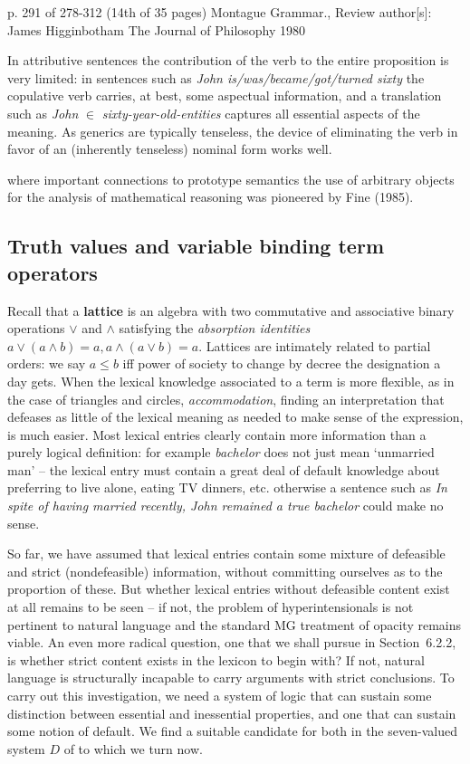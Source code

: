 p. 291 of 278-312 (14th of 35 pages) Montague Grammar., Review author[s]:
James Higginbotham The Journal of Philosophy 1980 

In attributive sentences the contribution of the verb to the entire
proposition is very limited: in sentences such as {\it John
is/was/became/got/turned sixty} the copulative verb carries, at best, some
aspectual information, and a translation such as {\it John} $\in$ {\it
sixty-year-old-entities} captures all essential aspects of the meaning.  As
generics are typically tenseless, the device of eliminating the verb in favor
of an (inherently tenseless) nominal form works well. 

where important connections to prototype semantics the use of arbitrary
objects for the analysis of mathematical reasoning was pioneered by Fine
(1985).


\subsection{Truth values and variable binding term operators}

Recall that a {\bf lattice}  is an algebra with two commutative
and associative binary operations $\vee$ and $\wedge$ satisfying the {\it  
  absorption identities} $a \vee (a \wedge b) = a, a \wedge (a \vee b) =
a$. Lattices are intimately related to partial orders: we say $a \leq b $ iff 
power of society to change by decree the designation a day gets. When the  
lexical knowledge associated to a term is more flexible, as in the case of 
triangles and circles, {\it accommodation}, finding an interpretation that
defeases as little of the lexical meaning as needed to make sense of the
expression, is much easier.  Most lexical entries clearly
contain more information than a purely logical definition: for example {\it  
bachelor} does not just mean `unmarried man' -- the lexical entry must
contain a great deal of default knowledge about preferring to live alone,
eating TV dinners, etc. otherwise a sentence such as {\it In spite of having
married recently, John remained a true bachelor} could make no sense.

So far, we have assumed that lexical entries contain some mixture of
defeasible and strict (nondefeasible) information, without committing
ourselves as to the proportion of these. But whether lexical entries without
defeasible content exist at all remains to be seen -- if not, the problem of
hyperintensionals is not pertinent to natural language and the standard MG
treatment of opacity remains viable. An even more radical question, one that
we shall pursue in Section~6.2.2, is whether strict content exists in the lexicon to
begin with?  If not, natural language is structurally incapable to carry
arguments with strict conclusions. To carry out this investigation, we need a 
system of logic that can sustain some distinction between essential and
inessential properties, and one that can sustain some notion of default.  We
find a suitable candidate for both in the seven-valued system $D$ of
 to which we turn now.

